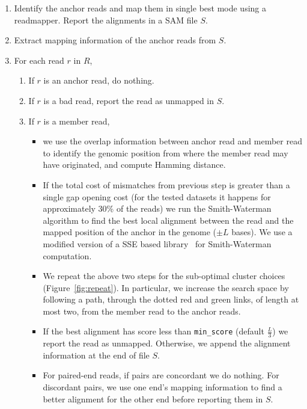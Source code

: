 \documentclass[a4paper]{article}
\begin{document}
\begin{enumerate}
\setlength{\itemsep}{1pt}
  \setlength{\parskip}{0pt}
  \setlength{\parsep}{0pt}
\item Identify the anchor reads and map them in single best mode using
a readmapper. Report the alignments in a SAM file $S$.
\item Extract mapping information of the anchor reads from $S$.
\item For each read $r$ in $R$,
  \begin{enumerate}
  \setlength{\itemsep}{1pt}
  \setlength{\parskip}{0pt}
  \setlength{\parsep}{0pt}
  \item If $r$ is an anchor read, do nothing.
  \item If $r$ is a bad read, report the read as unmapped in $S$.
  \item If $r$ is a member read,
	\begin{itemize}
	\item we use the overlap information between anchor read and member
	read to identify the genomic position from where
	the member read may have originated, and compute Hamming distance.
	\item If the total cost of mismatches from previous step is greater
	than a single gap opening
	cost (for the tested datasets it happens for approximately 30\% of the reads)
	we run the Smith-Waterman
    algorithm \cite{Smith1981195} to find the best local alignment
    between the read and the mapped position of the anchor in the genome
    ($\pm L$ bases). We use a modified version of a SSE based library~\cite{Beneke:1997hv} for Smith-Waterman computation.
    \item We repeat the above two steps for the sub-optimal cluster
    choices (Figure~\ref{fig:repeat}). In particular, we increase the search
    space by following a path, through the dotted red and green links, of length at most two,
    from the member read to the anchor reads.
	\item If the best alignment has score less than {\tt min\_score}
	(default $\frac{L}{3}$) we report the read as
    unmapped. Otherwise, we append the alignment information at the
    end of file $S$.
    \item For paired-end reads, if pairs are concordant we do nothing.
    For discordant pairs, we use one end's mapping information to find
    a better alignment for the other end before reporting them in $S$.
    \end{itemize}
  \end{enumerate}
\end{enumerate}
\end{document}
